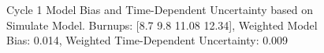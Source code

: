 \begin{figure}[htbp]
{\begin{tikzpicture}[x=1in,y=1in]
      \end{tikzpicture}
    }
    


    \caption{Cycle 1 Model Bias and Time-Dependent Uncertainty based on Simulate Model. Burnups: [8.7 9.8 11.08 12.34], Weighted Model Bias: 0.014, Weighted Time-Dependent Uncertainty: 0.009 \label{fig:sim-cyc1-eighth-map-8.7-9.8-11.08-12.34}}
\end{figure}

